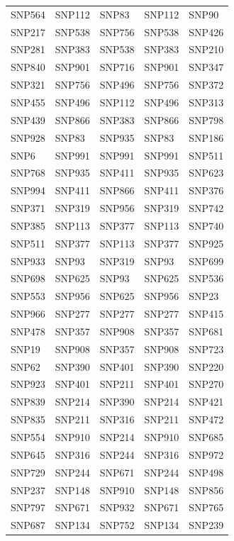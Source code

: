 \begin{table}[ht]
\begin{tabular}{lllll}
  SNP564 & SNP112 & SNP83 & SNP112 & SNP90 \\ 
  SNP217 & SNP538 & SNP756 & SNP538 & SNP426 \\ 
  SNP281 & SNP383 & SNP538 & SNP383 & SNP210 \\ 
  SNP840 & SNP901 & SNP716 & SNP901 & SNP347 \\ 
  SNP321 & SNP756 & SNP496 & SNP756 & SNP372 \\ 
  SNP455 & SNP496 & SNP112 & SNP496 & SNP313 \\ 
  SNP439 & SNP866 & SNP383 & SNP866 & SNP798 \\ 
  SNP928 & SNP83 & SNP935 & SNP83 & SNP186 \\ 
  SNP6 & SNP991 & SNP991 & SNP991 & SNP511 \\ 
  SNP768 & SNP935 & SNP411 & SNP935 & SNP623 \\ 
  SNP994 & SNP411 & SNP866 & SNP411 & SNP376 \\ 
  SNP371 & SNP319 & SNP956 & SNP319 & SNP742 \\ 
  SNP385 & SNP113 & SNP377 & SNP113 & SNP740 \\ 
  SNP511 & SNP377 & SNP113 & SNP377 & SNP925 \\ 
  SNP933 & SNP93 & SNP319 & SNP93 & SNP699 \\ 
  SNP698 & SNP625 & SNP93 & SNP625 & SNP536 \\ 
  SNP553 & SNP956 & SNP625 & SNP956 & SNP23 \\ 
  SNP966 & SNP277 & SNP277 & SNP277 & SNP415 \\ 
  SNP478 & SNP357 & SNP908 & SNP357 & SNP681 \\ 
  SNP19 & SNP908 & SNP357 & SNP908 & SNP723 \\ 
  SNP62 & SNP390 & SNP401 & SNP390 & SNP220 \\ 
  SNP923 & SNP401 & SNP211 & SNP401 & SNP270 \\ 
  SNP839 & SNP214 & SNP390 & SNP214 & SNP421 \\ 
  SNP835 & SNP211 & SNP316 & SNP211 & SNP472 \\ 
  SNP554 & SNP910 & SNP214 & SNP910 & SNP685 \\ 
  SNP645 & SNP316 & SNP244 & SNP316 & SNP972 \\ 
  SNP729 & SNP244 & SNP671 & SNP244 & SNP498 \\ 
  SNP237 & SNP148 & SNP910 & SNP148 & SNP856 \\ 
  SNP797 & SNP671 & SNP932 & SNP671 & SNP765 \\ 
  SNP687 & SNP134 & SNP752 & SNP134 & SNP239 \\ 

\end{tabular}
\end{table}
